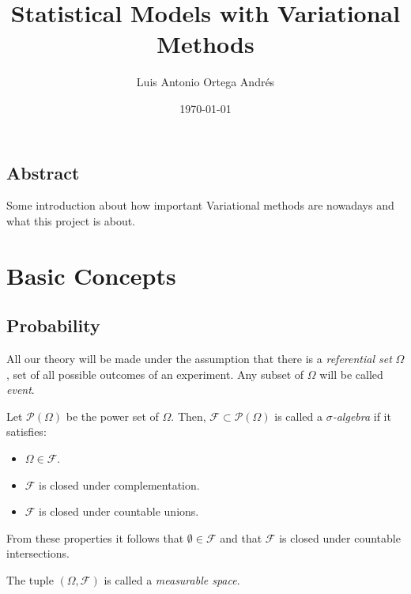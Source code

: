 \documentclass[oneside,openright,titlepage,numbers=noenddot,openany,headinclude,footinclude=true,
  cleardoublepage=empty,abstractoff,BCOR=5mm,paper=a4,fontsize=12pt]{scrreprt}
\author{Luis Antonio Ortega Andrés}
\date{\today}
\title{Statistical Models with Variational Methods}
\begin{document}
\maketitle
\tableofcontents

\chapter*{Abstract}

Some introduction about how important Variational methods are nowadays and what this project is about.

\part{Basic Concepts}

\chapter{Probability}

All our theory will be made under the assumption that there is a \emph{referential
set} \(\Omega\), set of all possible outcomes of an experiment. Any subset of
\(\Omega\) will be called \emph{event}.

\begin{definition}
Let \(\mathcal{P}(\Omega)\) be the power set of \(\Omega\). Then, \(\mathcal{F} \subset \mathcal{P}(\Omega)\) is called a
\emph{\(\sigma\)-algebra} if it satisfies:
\begin{itemize}
\item \(\Omega \in \mathcal{F}\).
\item \(\mathcal{F}\) is closed under complementation.
\item \(\mathcal{F}\) is closed under countable unions.
\end{itemize}
From these properties it follows that \(\emptyset \in \mathcal{F}\) and that \(\mathcal{F}\)
is closed under countable intersections.

The tuple \((\Omega, \mathcal{F})\) is called a \emph{measurable space}.
\end{definition}
\end{document}
